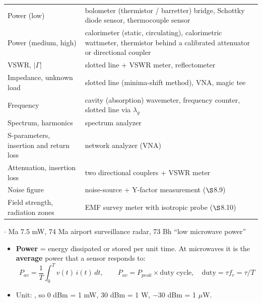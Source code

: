 {\begin{tabularx}{\linewidth}{@{}L{2.35cm}X@{}}
\midrule
Power (low) & bolometer (thermistor / barretter) bridge, Schottky diode sensor, thermocouple sensor \\
Power (medium, high) & calorimeter (static, circulating), calorimetric wattmeter, thermistor behind a calibrated attenuator or directional coupler \\
VSWR, $|\Gamma|$ & slotted line + VSWR meter, reflectometer \\
Impedance, unknown load & slotted line (minima-shift method), VNA, magic tee \\
Frequency & cavity (absorption) wavemeter, frequency counter, slotted line via $\lambda_g$ \\
Spectrum, harmonics & spectrum analyzer \\
S-parameters, insertion and return loss & network analyzer (VNA) \\
Attenuation, insertion loss & two directional couplers + VSWR meter \\
Noise figure & noise-source + Y-factor measurement ($\S$8.9) \\
Field strength, radiation zones & EMF survey meter with isotropic probe ($\S$8.10) \\
\bottomrule
\end{tabularx}}

\vspace{2pt}


{\color{sub}\footnotesize {}  \gap$\cdot$ Ma 7.5 mW, 74 Ma airport surveillance radar, 73 Bh ``low microwave power''}

\begin{itemize}
  \item \textbf{Power} = energy dissipated or stored per unit time. At microwaves it is the
    \textbf{average} power that a sensor responds to:
    \[ P_{av} = \frac{1}{T}\int_0^T v(t)\,i(t)\,dt, \qquad
       P_{av} = P_{peak}\times \text{duty cycle}, \quad
       \text{duty} = \tau f_r = \tau/T \]
  \item Unit: , so
    0 dBm = 1 mW, 30 dBm = 1 W, $-30$ dBm = 1 $\mu$W.
\end{itemize}

